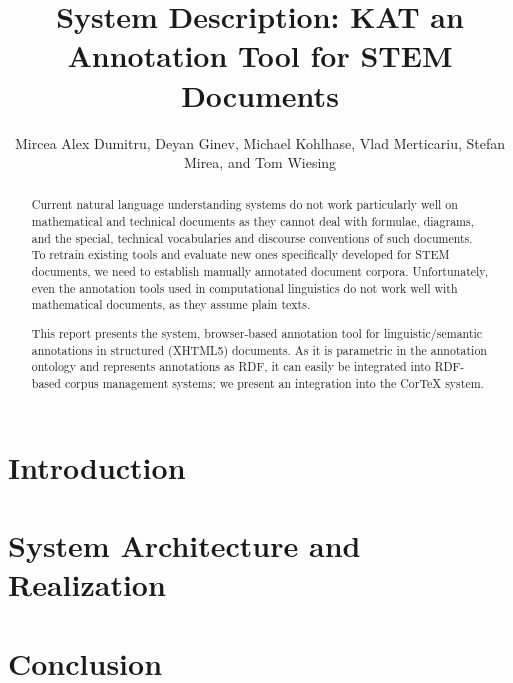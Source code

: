 \documentclass{llncs}
\title{System Description: KAT an Annotation Tool for STEM Documents}
\author{Mircea Alex Dumitru, Deyan Ginev, Michael  Kohlhase, Vlad Merticariu, Stefan
  Mirea, and Tom Wiesing}
\institute{
  Computer Science\\ Jacobs University Bremen\\
  \url{http://kwarc.info}
}
\begin{document}
\maketitle
\begin{abstract}
  Current natural language understanding systems do not work particularly well on
  mathematical and technical documents as they cannot deal with formulae, diagrams, and
  the special, technical vocabularies and discourse conventions of such documents. To
  retrain existing tools and evaluate new ones specifically developed for STEM documents,
  we need to establish manually annotated document corpora. Unfortunately, even the
  annotation tools used in computational linguistics do not work well with mathematical
  documents, as they assume plain texts.

  This report presents the \KAT system, browser-based annotation tool for
  linguistic/semantic annotations in structured (XHTML5) documents. As it is parametric in
  the annotation ontology and represents annotations as RDF, it can easily be integrated
  into RDF-based corpus management systems; we present an integration into the CorTeX
  system.
\end{abstract}

\section{Introduction}\label{sec:intro}


\section{System Architecture and Realization}\label{sec:arch}

\section{Conclusion}\label{sec:concl}


\printbibliography
\end{document}
